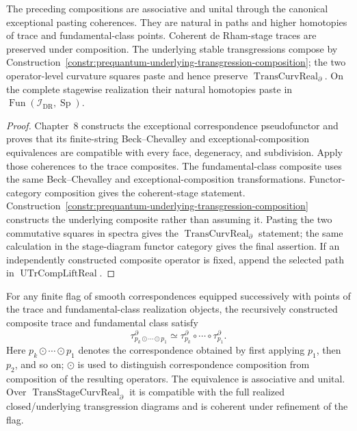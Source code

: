 \begin{theorem}
\label{thm:prequantum-coherent-trace-fundamental-composition}
The preceding compositions are associative and unital through the canonical
exceptional pasting coherences.  They are natural in paths and higher homotopies
of trace and fundamental-class points.  Coherent de Rham-stage traces are
preserved under composition.  The underlying stable transgressions compose by
Construction~\ref{constr:prequantum-underlying-transgression-composition}; the
two operator-level curvature squares paste and hence preserve
$\operatorname{TransCurvReal}_{\partial}$.  On the complete stagewise
realization their natural homotopies paste in
$\operatorname{Fun}(\mathcal I_{\mathrm{DR}},\operatorname{Sp})$.
\end{theorem}

\begin{proof}
Chapter~8 constructs the exceptional correspondence pseudofunctor and proves that
its finite-string Beck--Chevalley and exceptional-composition equivalences are
compatible with every face, degeneracy, and subdivision.  Apply those coherences
to the trace composites.  The fundamental-class composite uses the same
Beck--Chevalley and exceptional-composition transformations.  Functor-category
composition gives the coherent-stage statement.  Construction~\ref{constr:prequantum-underlying-transgression-composition}
constructs the underlying composite rather than assuming it.  Pasting the two
commutative squares in spectra gives the
$\operatorname{TransCurvReal}_{\partial}$ statement; the same calculation in
the stage-diagram functor category gives the final assertion.  If an independently
constructed composite operator is fixed, append the selected path in
$\operatorname{UTrCompLiftReal}$.
\end{proof}

\begin{theorem}
\label{thm:prequantum-fubini-transgression}
For any finite flag of smooth correspondences equipped successively with points of
the trace and fundamental-class realization objects, the recursively constructed
composite trace and fundamental class satisfy
\[
\boxed{
\tau^\partial_{p_k\odot\cdots\odot p_1}
\simeq
\tau^\partial_{p_k}\circ\cdots\circ\tau^\partial_{p_1}.
}
\]
Here $p_k\odot\cdots\odot p_1$ denotes the correspondence obtained by first
applying $p_1$, then $p_2$, and so on; $\odot$ is used to distinguish
correspondence composition from composition of the resulting operators.
The equivalence is associative and unital.  Over
$\operatorname{TransStageCurvReal}_{\partial}$ it is compatible with the full
realized closed/underlying transgression diagrams and is coherent under
refinement of the flag.
\end{theorem}

